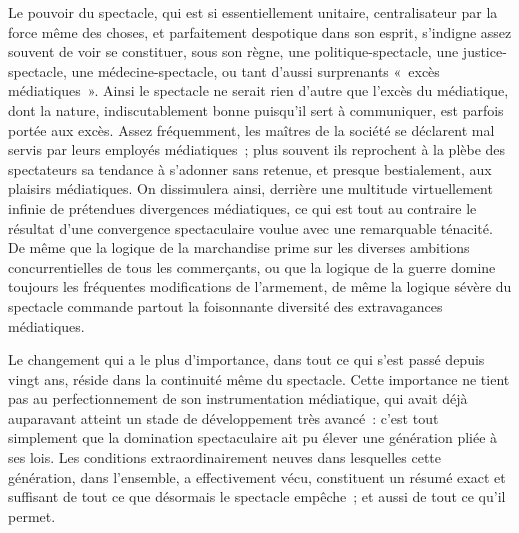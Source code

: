 \documentclass[french,twoside]{book} %
\def\bignobreak{\ifdim\lastskip<\bigskipamount
  \removelastskip\nopagebreak\bigskip\fi}
\newcommand{\labelblock}[1]{\bigbreak{\color{rubric}\noindent\textbf{#1}\par}\bignobreak}
\begin{document}
Le pouvoir du spectacle, qui est si essentiellement unitaire, centralisateur par la force même des choses, et parfaitement despotique dans son esprit, s’indigne assez souvent de voir se constituer, sous son règne, une politique-spectacle, une justice-spectacle, une médecine-spectacle, ou tant d’aussi surprenants « excès médiatiques ». Ainsi le spectacle ne serait rien d’autre que l’excès du médiatique, dont la nature, indiscutablement bonne puisqu’il sert à communiquer, est parfois portée aux excès. Assez fréquemment, les maîtres de la société se déclarent mal servis par leurs employés médiatiques ; plus souvent ils reprochent à la plèbe des spectateurs sa tendance à s’adonner sans retenue, et presque bestialement, aux plaisirs médiatiques. On dissimulera ainsi, derrière une multitude virtuellement infinie de prétendues divergences médiatiques, ce qui est tout au contraire le résultat d’une convergence spectaculaire voulue avec une remarquable ténacité. De même que la logique de la marchandise prime sur les diverses ambitions concurrentielles de tous les commerçants, ou que la logique de la guerre domine toujours les fréquentes modifications de l’armement, de même la logique sévère du spectacle commande partout la foisonnante diversité des extravagances médiatiques.\par
Le changement qui a le plus d’importance, dans tout ce qui s’est passé depuis vingt ans, réside dans la continuité même du spectacle. Cette importance ne tient pas au perfectionnement de son instrumentation médiatique, qui avait déjà auparavant atteint un stade de développement très avancé : c’est tout simplement que la domination spectaculaire ait pu élever une génération pliée à ses lois. Les conditions extraordinairement neuves dans lesquelles cette génération, dans l’ensemble, a effectivement vécu, constituent un résumé exact et suffisant de tout ce que désormais le spectacle empêche ; et aussi de tout ce qu’il permet.\par

\labelblock{IV}
\end{document}

